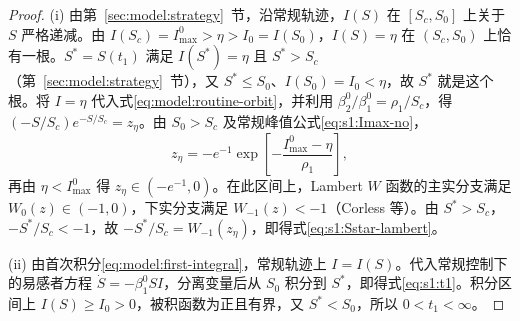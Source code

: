 \begin{proof}
(i) 由第~\ref{sec:model:strategy}~节，沿常规轨迹，$I(S)$ 在 $[S_c,S_0]$ 上关于 $S$ 严格递减。由 $I(S_c)=I_{\max}^{0}>\eta>I_0=I(S_0)$，$I(S)=\eta$ 在 $(S_c,S_0)$ 上恰有一根。$S^*=S(t_1)$ 满足 $I(S^*)=\eta$ 且 $S^*>S_c$（第~\ref{sec:model:strategy}~节），又 $S^*\le S_0$、$I(S_0)=I_0<\eta$，故 $S^*$ 就是这个根。将 $I=\eta$ 代入式\eqref{eq:model:routine-orbit}，并利用 $\beta_2^0/\beta_1^0=\rho_1/S_c$，得
$(-S/S_c)e^{-S/S_c}=z_\eta$。由 $S_0>S_c$ 及常规峰值公式\eqref{eq:s1:Imax-no}，
\[
z_\eta=-e^{-1}\exp\!\left[-\frac{I_{\max}^{0}-\eta}{\rho_1}\right],
\]
再由 $\eta<I_{\max}^{0}$ 得 $z_\eta\in(-e^{-1},0)$。在此区间上，Lambert $W$ 函数的主实分支满足 $W_0(z)\in(-1,0)$，下实分支满足 $W_{-1}(z)<-1$（Corless 等\cite{Corless1996}）。由 $S^*>S_c$，$-S^*/S_c<-1$，故 $-S^*/S_c=W_{-1}(z_\eta)$，即得式\eqref{eq:s1:Sstar-lambert}。

(ii) 由首次积分\eqref{eq:model:first-integral}，常规轨迹上 $I=I(S)$。代入常规控制下的易感者方程 $\dot S=-\beta_1^0SI$，分离变量后从 $S_0$ 积分到 $S^*$，即得式\eqref{eq:s1:t1}。积分区间上 $I(S)\ge I_0>0$，被积函数为正且有界，又 $S^*<S_0$，所以 $0<t_1<\infty$。
\end{proof}

